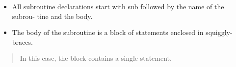 \documentclass[captions=tableheading]{article}
\begin{document}
\begin{itemize}
\item All subroutine declarations start with sub followed by the name of the subrou- tine and the body.
\item The body of the subroutine is a block of statements enclosed in squiggly-braces.
\end{itemize}

\begin{quote}
In this case, the block contains a single statement.
\end{quote}
\end{document}
